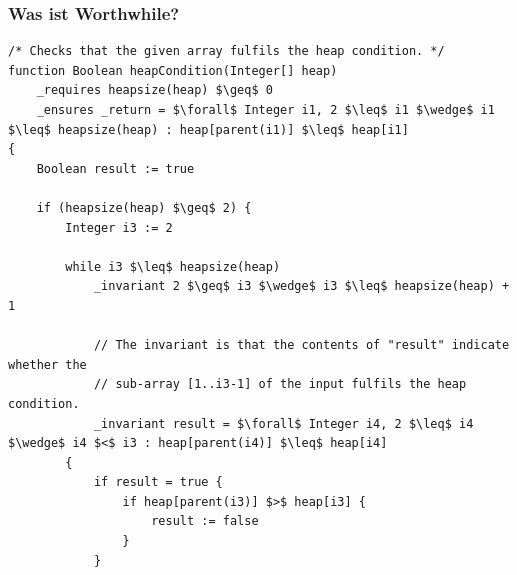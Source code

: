 \documentclass[t,svgnames]{beamer}
\begin{document}
\begin{frame}[fragile]
	\frametitle{Was ist Worthwhile?}
	
	\begin{lstlisting}[frame=lines,mathescape=true]
/* Checks that the given array fulfils the heap condition. */
function Boolean heapCondition(Integer[] heap)
    _requires heapsize(heap) $\geq$ 0
    _ensures _return = $\forall$ Integer i1, 2 $\leq$ i1 $\wedge$ i1 $\leq$ heapsize(heap) : heap[parent(i1)] $\leq$ heap[i1]
{
    Boolean result := true
    
    if (heapsize(heap) $\geq$ 2) {
        Integer i3 := 2
        
        while i3 $\leq$ heapsize(heap)
            _invariant 2 $\geq$ i3 $\wedge$ i3 $\leq$ heapsize(heap) + 1
            
            // The invariant is that the contents of "result" indicate whether the
            // sub-array [1..i3-1] of the input fulfils the heap condition.
            _invariant result = $\forall$ Integer i4, 2 $\leq$ i4 $\wedge$ i4 $<$ i3 : heap[parent(i4)] $\leq$ heap[i4]
        {
            if result = true {
                if heap[parent(i3)] $>$ heap[i3] {
                    result := false
                }
            }
    \end{lstlisting}
\end{frame}
\end{document}
